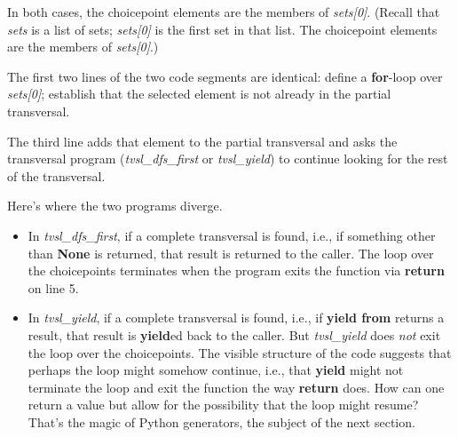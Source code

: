 
In both cases, the choicepoint elements are the members of \textit{sets[0]}. (Recall that \textit{sets} is a list of sets; \textit{sets[0]} is the first set in that list. The choicepoint elements are the members of \textit{sets[0]}.) 

The first two lines of the two code segments are identical: define a \textbf{for}-loop over \textit{sets[0]}; establish that the selected element is not already in the partial transversal.

The third line adds that element to the partial transversal and asks the transversal program (\textit{tvsl\_dfs\_first} or \textit{tvsl\_yield}) to continue looking for the rest of the transversal. 

Here's where the two programs diverge.
\begin{itemize}
    \item In \textit{tvsl\_dfs\_first}, if a complete transversal is found, i.e., if something other than \textbf{None} is returned, that result is returned to the caller. The loop over the choicepoints terminates when the program exits the function via \textbf{return} on line 5.
    
    \item In \textit{tvsl\_yield}, if a complete transversal is found, i.e., if \textbf{yield from} returns a result, that result is \textbf{yield}ed back to the caller. But \textit{tvsl\_yield} does \textit{not} exit the loop over the choicepoints. The visible structure of the code suggests that perhaps the loop might somehow continue, i.e., that \textbf{yield} might not terminate the loop and exit the function the way \textbf{return} does. How can one return a value but allow for the possibility that the loop might resume? That's the magic of Python generators, the subject of the next section. 
\end{itemize}

